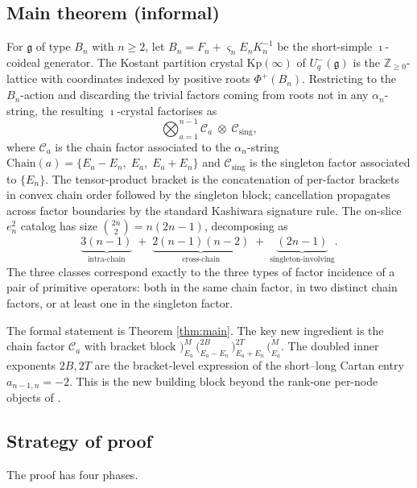 \documentclass[11pt]{article}
\theoremstyle{definition}
\theoremstyle{remark}
\newcommand{\Kp}{\mathrm{Kp}}
\newcommand{\Chain}{\mathrm{Chain}}
\newcommand{\Z}{\mathbb{Z}}
\newcommand{\Zn}{\Z_{\geq 0}}
\newcommand{\g}{\mathfrak{g}}
\newcommand{\Uqm}{U_q^-(\g)}
\newcommand{\Cmid}{\mathcal{C}}
\newcommand{\Csing}{\mathcal{C}_{\mathrm{sing}}}
\newcommand{\labr}[1]{{)}_{#1}}
\newcommand{\labl}[1]{{(}_{#1}}
\begin{document}
\subsection{Main theorem (informal)}

For $\g$ of type $B_n$ with $n \geq 2$, let $B_n = F_n + \varsigma_n E_n K_n^{-1}$ be the short-simple
$\imath$-coideal generator. The Kostant partition crystal $\Kp(\infty)$ of $\Uqm$ is the
$\Zn$-lattice with coordinates indexed by positive roots $\Phi^+(B_n)$. Restricting to the
$B_n$-action and discarding the trivial factors coming from roots not in any $\alpha_n$-string,
the resulting $\imath$-crystal factorises as
\[
\bigotimes_{a=1}^{n-1} \Cmid_a \;\otimes\; \Csing,
\]
where $\Cmid_a$ is the chain factor associated to the $\alpha_n$-string $\Chain(a) = \{E_a -
E_n,\; E_a,\; E_a + E_n\}$ and $\Csing$ is the singleton factor associated to $\{E_n\}$.
The tensor-product bracket is the concatenation of per-factor brackets in convex chain order
followed by the singleton block; cancellation propagates across factor boundaries by the
standard Kashiwara signature rule. The on-slice $e_n^2$ catalog has size $\binom{2n}{2} =
n(2n-1)$, decomposing as
\[
\underbrace{3(n-1)}_{\text{intra-chain}} \;+\; \underbrace{2(n-1)(n-2)}_{\text{cross-chain}} \;+\;
\underbrace{(2n-1)}_{\text{singleton-involving}}.
\]
The three classes correspond exactly to the three types of factor incidence of a pair of
primitive operators: both in the same chain factor, in two distinct chain factors, or at least
one in the singleton factor.

The formal statement is Theorem \ref{thm:main}. The key new ingredient is the chain factor
$\Cmid_a$ with bracket block $\labr{E_a}^M\, \labl{E_a - E_n}^{2B}\, \labr{E_a + E_n}^{2T}\,
\labl{E_a}^M$. The doubled inner exponents $2B, 2T$ are the bracket-level expression of the
short--long Cartan entry $a_{n-1,n} = -2$. This is the new building block beyond the rank-one
per-node objects of \cite[\S4.1]{Watanabe2110}.

\subsection{Strategy of proof}

The proof has four phases.
\end{document}
